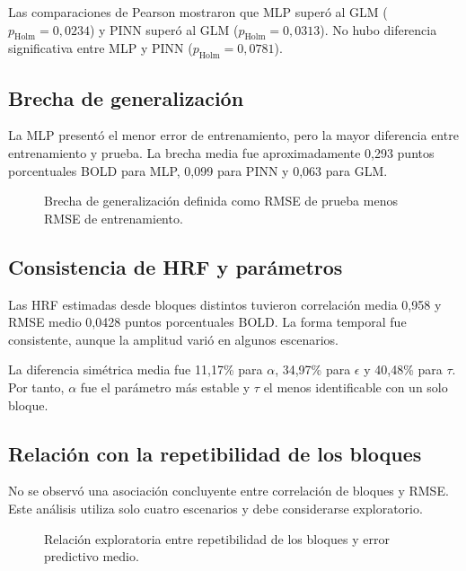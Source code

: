 Las comparaciones de Pearson mostraron que MLP superó al GLM ($p_{\mathrm{Holm}}=0,0234$) y PINN superó al GLM ($p_{\mathrm{Holm}}=0,0313$). No hubo diferencia significativa entre MLP y PINN ($p_{\mathrm{Holm}}=0,0781$).

\subsection{Brecha de generalización}

La MLP presentó el menor error de entrenamiento, pero la mayor diferencia entre entrenamiento y prueba. La brecha media fue aproximadamente 0,293 puntos porcentuales BOLD para MLP, 0,099 para PINN y 0,063 para GLM.

\begin{figure}[H]
\centering
{}
\caption{Brecha de generalización definida como RMSE de prueba menos RMSE de entrenamiento.}
\label{fig:real_generalization_gap}
\end{figure}

\subsection{Consistencia de HRF y parámetros}

Las HRF estimadas desde bloques distintos tuvieron correlación media 0,958 y RMSE medio 0,0428 puntos porcentuales BOLD. La forma temporal fue consistente, aunque la amplitud varió en algunos escenarios.

La diferencia simétrica media fue 11,17\% para $\alpha$, 34,97\% para $\epsilon$ y 40,48\% para $\tau$. Por tanto, $\alpha$ fue el parámetro más estable y $\tau$ el menos identificable con un solo bloque.

\subsection{Relación con la repetibilidad de los bloques}

No se observó una asociación concluyente entre correlación de bloques y RMSE. Este análisis utiliza solo cuatro escenarios y debe considerarse exploratorio.

\begin{figure}[H]
\centering
{}
\caption{Relación exploratoria entre repetibilidad de los bloques y error predictivo medio.}
\label{fig:real_repeatability}
\end{figure}
